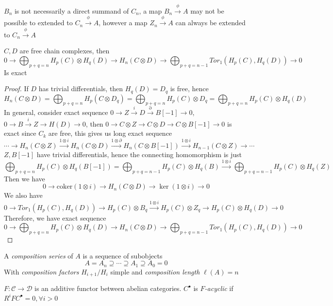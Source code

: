 \documentclass[main]{subfiles}
\begin{document}
\begin{remark}
$B_n$ is not necessarily a direct summand of $C_n$, a map $B_n\xrightarrow{\phi} A$ may not be possible to extended to $C_n\xrightarrow{\phi} A$, however a map $Z_n\xrightarrow{\phi} A$ can always be extended to $C_n\xrightarrow{\phi} A$
\end{remark}

\begin{theorem}\label{Algebraic Kunneth formula}
$C,D$ are free chain complexes, then
\[0\to\bigoplus_{p+q=n}H_p(C)\otimes H_q(D)\to H_n(C\otimes D)\to \bigoplus_{p+q=n-1}Tor_1(H_p(C),H_q(D))\to0\]
Is exact
\end{theorem}

\begin{proof}
If $D$ has trivial differentials, then $H_q(D)=D_q$ is free, hence
\[H_n(C\otimes D)=\bigoplus_{p+q=n}H_p(C\otimes D_q)=\bigoplus_{p+q=n}H_p(C)\otimes D_q=\bigoplus_{p+q=n}H_p(C)\otimes H_q(D)\]
In general, consider exact sequence $0\to Z\xrightarrow{i} D\xrightarrow{\partial}  B[-1]\to0$, $0\to B\xrightarrow{i}Z\to H(D)\to0$, then $0\to C\otimes Z\to C\otimes D\to C\otimes B[-1]\to 0$ is exact since $C_k$ are free, this gives us long exact sequence
\[\cdots\to H_n(C\otimes Z)\xrightarrow{1\otimes i}H_n(C\otimes D)\xrightarrow{1\otimes \partial}H_n(C\otimes B[-1])\xrightarrow{1\otimes i} H_{n-1}(C\otimes Z)\to \cdots\]
$Z,B[-1]$ have trivial differentials, hence the connecting homomorphism is just
\[\bigoplus_{p+q=n}H_{p}(C)\otimes H_{q}(B[-1])=\bigoplus_{p+q=n-1}H_{p}(C)\otimes H_q(B)\xrightarrow{1\otimes i}\bigoplus_{p+q=n-1}H_{p}(C)\otimes H_{q}(Z)\]
Then we have
\[0\to\mathrm{coker}(1\otimes i)\to H_n(C\otimes D)\to\ker(1\otimes i)\to0\]
We also have
\[0\to Tor_1(H_p(C),H_q(D))\to H_p(C)\otimes B_q\xrightarrow{1\otimes i} H_p(C)\otimes Z_q\to H_p(C)\otimes H_q(D)\to0\]
Therefore, we have exact sequence
\[0\to\bigoplus_{p+q=n}H_p(C)\otimes H_q(D)\to H_n(C\otimes D)\to \bigoplus_{p+q=n-1}Tor_1(H_p(C),H_q(D))\to0\]
\end{proof}

\begin{definition}
A \textit{composition series} of $A$ is a sequence of subobjects
\[A=A_n\supseteq \cdots\supseteq A_1\supseteq A_0=0\]
With \textit{composition factors} $H_{i+1}/H_i$ simple and \textit{composition length} $\ell(A)=n$
\end{definition}

\begin{definition}
$F:\mathscr C\to\mathscr D$ is an additive functor between abelian categories. $C^\bullet$ is \textit{$F$-acyclic} if $R^iFC^\bullet=0,\forall i>0$
\end{definition}
\end{document}

